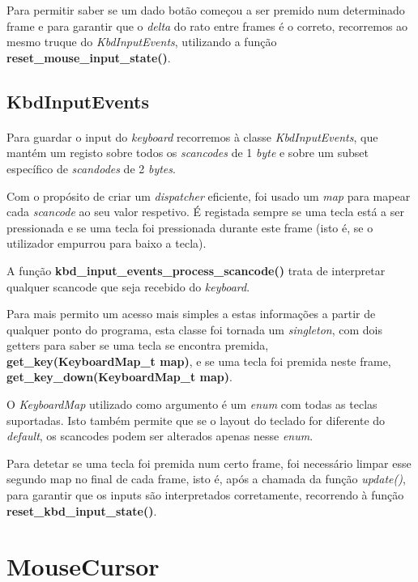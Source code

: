 \documentclass{report}
\begin{document}
Para permitir saber se um dado botão começou a ser premido num determinado frame e para garantir que o \textit{delta} do rato entre frames é o correto, recorremos ao mesmo truque do \textit{KbdInputEvents}, utilizando a função \textbf{reset\_mouse\_input\_state()}.

\subsection{KbdInputEvents}

\paragraph{}
Para guardar o input do \textit{keyboard} recorremos à classe \textit{KbdInputEvents}, que mantém um registo sobre todos os \textit{scancodes} de 1 \textit{byte} e sobre um subset específico de \textit{scandodes} de 2 \textit{bytes}.

Com o propósito de criar um \textit{dispatcher} eficiente, foi usado um \textit{map} para mapear cada \textit{scancode} ao seu valor respetivo. É registada sempre se uma tecla está a ser pressionada e se uma tecla foi pressionada durante este frame (isto é, se o utilizador empurrou para baixo a tecla).

A função \textbf{kbd\_input\_events\_process\_scancode()} trata de interpretar qualquer scancode que seja recebido do \textit{keyboard}.

Para mais permito um acesso mais simples a estas informações a partir de qualquer ponto do programa, esta classe foi tornada um \textit{singleton}, com dois getters para saber se uma tecla se encontra premida, \textbf{get\_key(KeyboardMap\_t map)}, e se uma tecla foi premida neste frame, \textbf{get\_key\_down(KeyboardMap\_t map)}.

O \textit{KeyboardMap} utilizado como argumento é um \textit{enum} com todas as teclas suportadas. Isto também permite que se o layout do teclado for diferente do \textit{default}, os scancodes podem ser alterados apenas nesse \textit{enum}.

Para detetar se uma tecla foi premida num certo frame, foi necessário limpar esse segundo map no final de cada frame, isto é, após a chamada da função \textit{update()}, para garantir que os inputs são interpretados corretamente, recorrendo à função \textbf{reset\_kbd\_input\_state()}.\newline

\section{MouseCursor}
\end{document}

